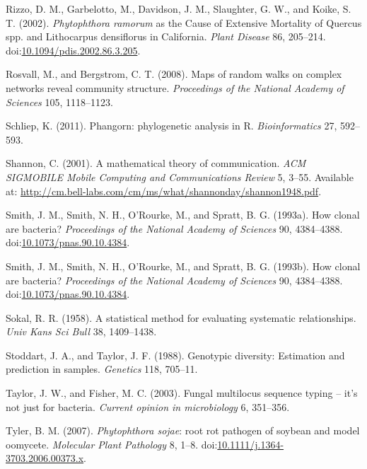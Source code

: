 \documentclass[double,12pt]{beavtex}
\begin{document}
  \hypertarget{ref-rizzo2002phytophthora}{}
  Rizzo, D. M., Garbelotto, M., Davidson, J. M., Slaughter, G. W., and
  Koike, S. T. (2002). \emph{Phytophthora ramorum} as the Cause of
  Extensive Mortality of Quercus spp. and Lithocarpus densiflorus in
  California. \emph{Plant Disease} 86, 205--214.
  doi:\href{https://doi.org/10.1094/pdis.2002.86.3.205}{10.1094/pdis.2002.86.3.205}.
  
  \hypertarget{ref-rosvall2008maps}{}
  Rosvall, M., and Bergstrom, C. T. (2008). Maps of random walks on
  complex networks reveal community structure. \emph{Proceedings of the
  National Academy of Sciences} 105, 1118--1123.
  
  \hypertarget{ref-phangorn}{}
  Schliep, K. (2011). Phangorn: phylogenetic analysis in R.
  \emph{Bioinformatics} 27, 592--593.
  
  \hypertarget{ref-shannon2001mathematical}{}
  Shannon, C. (2001). A mathematical theory of communication. \emph{ACM
  SIGMOBILE Mobile Computing and Communications Review} 5, 3--55.
  Available at:
  \url{http://cm.bell-labs.com/cm/ms/what/shannonday/shannon1948.pdf}.
  
  \hypertarget{ref-Smith:1993}{}
  Smith, J. M., Smith, N. H., O'Rourke, M., and Spratt, B. G. (1993a). How
  clonal are bacteria? \emph{Proceedings of the National Academy of
  Sciences} 90, 4384--4388.
  doi:\href{https://doi.org/10.1073/pnas.90.10.4384}{10.1073/pnas.90.10.4384}.
  
  \hypertarget{ref-smith1993how}{}
  Smith, J. M., Smith, N. H., O'Rourke, M., and Spratt, B. G. (1993b). How
  clonal are bacteria? \emph{Proceedings of the National Academy of
  Sciences} 90, 4384--4388.
  doi:\href{https://doi.org/10.1073/pnas.90.10.4384}{10.1073/pnas.90.10.4384}.
  
  \hypertarget{ref-sokal1958statistical}{}
  Sokal, R. R. (1958). A statistical method for evaluating systematic
  relationships. \emph{Univ Kans Sci Bull} 38, 1409--1438.
  
  \hypertarget{ref-stoddart1988genotypic}{}
  Stoddart, J. A., and Taylor, J. F. (1988). Genotypic diversity:
  Estimation and prediction in samples. \emph{Genetics} 118, 705--11.
  
  \hypertarget{ref-taylor2003fungal}{}
  Taylor, J. W., and Fisher, M. C. (2003). Fungal multilocus sequence
  typing -- it's not just for bacteria. \emph{Current opinion in
  microbiology} 6, 351--356.
  
  \hypertarget{ref-tyler2007phytophthora}{}
  Tyler, B. M. (2007). \emph{Phytophthora sojae}: root rot pathogen of
  soybean and model oomycete. \emph{Molecular Plant Pathology} 8, 1--8.
  doi:\href{https://doi.org/10.1111/j.1364-3703.2006.00373.x}{10.1111/j.1364-3703.2006.00373.x}.
  
\end{document}
